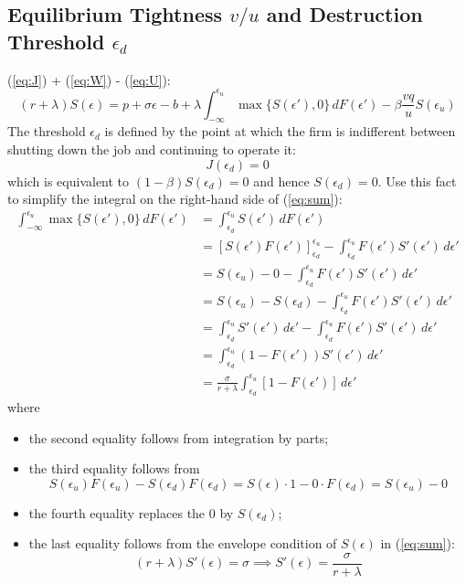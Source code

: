 \documentclass[12pt]{article}
\begin{document}
\subsection{Equilibrium Tightness $v/u$ and Destruction Threshold $\epsilon_d$}
(\ref{eq:J}) + (\ref{eq:W}) - (\ref{eq:U}):
\begin{equation} \label{eq:sum}
	(r+\lambda) S(\epsilon) = p + \sigma \epsilon - b + \lambda \int_{-\infty}^{\epsilon_u} \max\{S(\epsilon'), 0\} \, dF(\epsilon') - \beta \frac{vq}{u} S(\epsilon_u)
\end{equation}
The threshold $\epsilon_d$ is defined by the point at which the firm is indifferent between shutting down the job and continuing to operate it:
\begin{equation}
	J(\epsilon_d) = 0 
\end{equation}
which is equivalent to $(1-\beta) S(\epsilon_d) = 0$ and hence $S(\epsilon_d) = 0$. Use this fact to simplify the integral on the right-hand side of (\ref{eq:sum}): 
\begin{align}
	\int_{-\infty}^{\epsilon_u} \max\{S(\epsilon'), 0\} \, dF(\epsilon') & = \int_{\epsilon_d}^{\epsilon_u} S(\epsilon') \, dF(\epsilon') \nonumber \\
	& = \left[S(\epsilon')F(\epsilon')\right]_{\epsilon_d}^{\epsilon_u} -  \int_{\epsilon_d}^{\epsilon_u} F(\epsilon') S'(\epsilon') \, d\epsilon' \nonumber \\
	& = S(\epsilon_u) - 0 -\int_{\epsilon_d}^{\epsilon_u} F(\epsilon') S'(\epsilon') \, d\epsilon' \nonumber \\
	& = S(\epsilon_u) - S(\epsilon_d) - \int_{\epsilon_d}^{\epsilon_u} F(\epsilon') S'(\epsilon') \, d\epsilon' \nonumber \\
	& = \int_{\epsilon_d}^{\epsilon_u} S'(\epsilon')\,d\epsilon' - \int_{\epsilon_d}^{\epsilon_u} F(\epsilon') S'(\epsilon') \, d\epsilon' \nonumber\\
	& = \int_{\epsilon_d}^{\epsilon_u} (1- F(\epsilon')) S'(\epsilon') \, d\epsilon' \nonumber \\
	& = \frac{\sigma}{r+\lambda} \int_{\epsilon_d}^{\epsilon_u} [1- F(\epsilon')] \, d\epsilon' \label{eq:integration}
\end{align}
where
\begin{itemize}
	\item the second equality follows from integration by parts;
	\item the third equality follows from
	\[S(\epsilon_u) F(\epsilon_u) - S(\epsilon_d) F(\epsilon_d) = S(\epsilon) \cdot 1 - 0 \cdot F(\epsilon_d) = S(\epsilon_u) - 0\]
	\item the fourth equality replaces the $0$ by $S(\epsilon_d)$;
	\item the last equality follows from the envelope condition of $S(\epsilon)$ in (\ref{eq:sum}):
	\[(r+\lambda) S'(\epsilon) = \sigma \implies S'(\epsilon) = \frac{\sigma}{r+\lambda}\]
\end{itemize}
\end{document}
